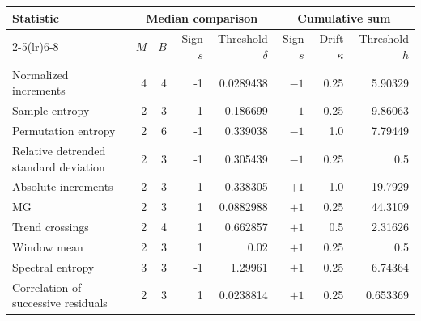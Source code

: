 \begin{tabular}{lrrrrrrr}
\toprule
Statistic & \multicolumn{4}{c}{Median comparison} & \multicolumn{3}{c}{Cumulative sum} \\
\cmidrule(lr){2-5}\cmidrule(lr){6-8}
 & $M$ & $B$ & Sign $s$ & Threshold $\delta$ & Sign $s$ & Drift $\kappa$ & Threshold $h$ \\
\midrule
Normalized increments & 4 & 4 & -1 & 0.0289438 & $-1$ & 0.25 & 5.90329 \\
Sample entropy & 2 & 3 & -1 & 0.186699 & $-1$ & 0.25 & 9.86063 \\
Permutation entropy & 2 & 6 & -1 & 0.339038 & $-1$ & 1.0 & 7.79449 \\
Relative detrended standard deviation & 2 & 3 & -1 & 0.305439 & $-1$ & 0.25 & 0.5 \\
Absolute increments & 2 & 3 & 1 & 0.338305 & $+1$ & 1.0 & 19.7929 \\
MG & 2 & 3 & 1 & 0.0882988 & $+1$ & 0.25 & 44.3109 \\
Trend crossings & 2 & 4 & 1 & 0.662857 & $+1$ & 0.5 & 2.31626 \\
Window mean & 2 & 3 & 1 & 0.02 & $+1$ & 0.25 & 0.5 \\
Spectral entropy & 3 & 3 & -1 & 1.29961 & $+1$ & 0.25 & 6.74364 \\
Correlation of successive residuals & 2 & 3 & 1 & 0.0238814 & $+1$ & 0.25 & 0.653369 \\
\bottomrule
\end{tabular}
